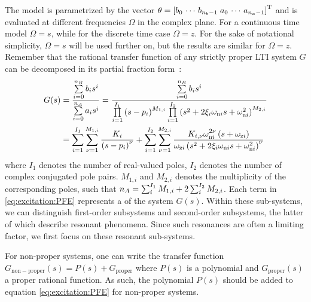 The model is parametrized by the vector $\theta = \left[b_0 \,\cdots\, b_{n_b-1} \; a_0 \,\cdots\, a_{n_a-1} \right]^{\mathrm{T}}$ and  is evaluated at different frequencies $\Omega$ in the complex plane.
For a continuous time model $\Omega = s$, while for the discrete time case $\Omega = z$.
For the sake of notational simplicity, $\Omega = s$ will be used further on, but the results are similar for $\Omega=z$.
Remember that the rational transfer function of any strictly proper \gls{LTI} system $G$ can be decomposed in its partial fraction form~\citep[Appendix]{Oppenheim1996}:
\begin{align}
  G(s) &= 
    \frac{\sum\limits_{i=0}^{\numel{B}} b_i s^i}
              {\sum\limits_{i=0}^{\numel{A}} a_i s^i} 
        =    
   \frac{\sum\limits_{i=0}^{\numel{B}} b_i s^i}
              {\prod\limits_{i=1}^{I_1} \left( s - \pole[i] \right)^{M_{1,i}} 
               \prod\limits_{i=1}^{I_2} \left(s^2 + 2 \damping[i] \wn[i] s + \wn[i]^2 \right)^{M_{2,i}}}
        \\
        &  = 
        \sum_{i=1}^{I_1} 
          \sum_{\multiplicity=1}^{M_{1,i}} 
            \frac{\dc[i]}
                      { \left( s - \pole[i] \right)^{\multiplicity}}
            + 
        \sum_{i=1}^{I_2} 
          \sum_{\multiplicity=1}^{M_{2,i}}
           \frac{\dc[i,\multiplicity] \wn[i]^{2\multiplicity} \left( s + \wz[i] \right)}
                     {\wz[i] \left(s^2 + 2 \damping[i] \wn[i] s + \wn[i]^2 \right)^{\multiplicity}}
        \label{eq:excitation:PFE}
\end{align}
where $I_1$ denotes the number of real-valued poles, $I_2$ denotes the number of complex conjugated pole pairs.
$M_{1,i}$ and $M_{2,i}$ denotes the multiplicity of the corresponding poles, such that $n_{A} = \sum_i^{I_1} M_{1,i} + 2 \sum_{i}^{I_2} M_{2,i}$.
Each term in \eqref{eq:excitation:PFE} represents a  of the system $G(s)$.
  Within these sub-systems, we can distinguish first-order subsystems and second-order subsystems, the latter of which describe resonant phenomena.
  Since such resonances are often a limiting factor, we first focus on these resonant sub-systems.
\begin{remark}
  For non-proper systems, one can write the transfer function $G_{\mathrm{non-proper}}(s) = P(s) + G_{\mathrm{proper}}$ where $P(s)$ is a polynomial and $G_{\mathrm{proper}}(s)$ a proper rational function.
  As such, the polynomial $P(s)$ should be added to equation \eqref{eq:excitation:PFE} for non-proper systems.
\end{remark}

